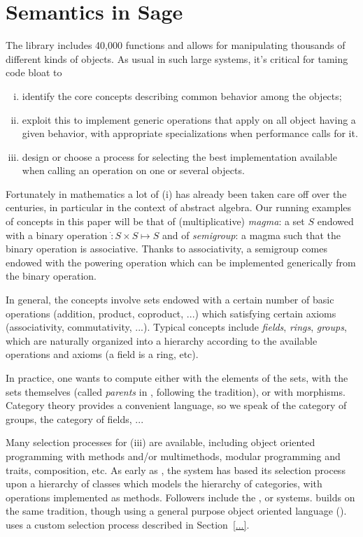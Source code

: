 \section{Semantics in Sage}

The \Sage library includes 40,000 functions and allows for manipulating
thousands of different kinds of objects. As usual in such large
systems, it's critical for taming code bloat to
\begin{enumerate}[(i)]
\item identify the core concepts describing common behavior among the
  objects;
\item exploit this to implement generic operations that apply on all
  object having a given behavior, with appropriate specializations
  when performance calls for it.
\item design or choose a process for selecting the best implementation
  available when calling an operation on one or several objects.
\end{enumerate}

Fortunately in mathematics a lot of (i) has already been taken care
off over the centuries, in particular in the context of abstract
algebra. Our running examples of concepts in this paper will be that
of (multiplicative) \emph{magma}: a set $S$ endowed with a binary
operation $\dot: S\times S \mapsto S$ and of \emph{semigroup}: a magma
such that the binary operation is associative. Thanks to
associativity, a semigroup comes endowed with the powering operation
which can be implemented generically from the binary operation.


In general, the concepts involve sets endowed with a certain number of
basic operations (addition, product, coproduct, ...) which satisfying
certain axioms (associativity, commutativity, ...). Typical concepts
include \emph{fields}, \emph{rings}, \emph{groups}, which are
naturally organized into a hierarchy according to the available
operations and axioms (a field is a ring, etc).

In practice, one wants to compute either with the elements of the
sets, with the sets themselves (called \emph{parents} in \Sage,
following the \Magma tradition), or with morphisms. Category theory
provides a convenient language, so we speak of the category of groups,
the category of fields, ...

Many selection processes for (iii) are available, including object
oriented programming with methods and/or multimethods, modular
programming and traits, composition, etc. As early as , the \Axiom system has based its selection process upon a
hierarchy of classes which models the hierarchy of categories, with
operations implemented as methods. Followers include the \MuPAD, or
\Fricas systems. \Sage builds on the same tradition, though using a
general purpose object oriented language (\Python). \GAP uses a custom
selection process described in Section~\ref{...}.

